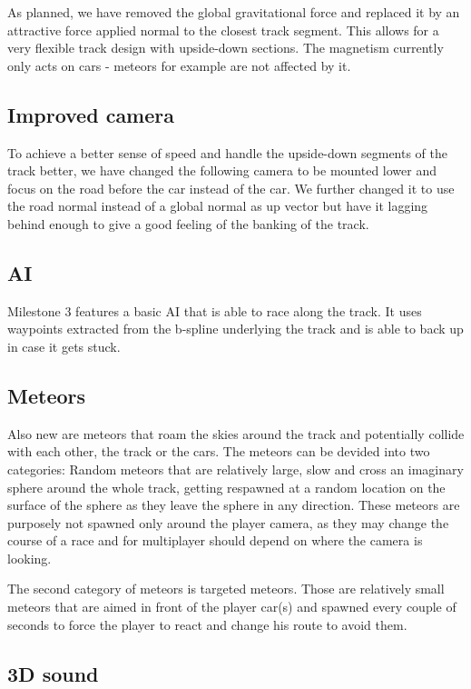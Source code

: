 \documentclass[11pt]{article}
\begin{document}
As planned, we have removed the global gravitational force and replaced it by an attractive force applied normal to the closest track segment.
This allows for a very flexible track design with upside-down sections. The magnetism currently only acts on cars - meteors for example are not affected by it.

\subsection{Improved camera}

To achieve a better sense of speed and handle the upside-down segments of the track better, we have changed the following camera to be mounted lower and focus on the road before the car instead of the car. We further changed it to use the road normal instead of a global normal as up vector but have it lagging behind enough to give a good feeling of the banking of the track.

\subsection{AI}

Milestone 3 features a basic AI that is able to race along the track. It uses waypoints extracted from the b-spline underlying the track and is able to back up in case it gets stuck.

\subsection{Meteors}

Also new are meteors that roam the skies around the track and potentially collide with each other, the track or the cars. The meteors can be devided into two categories: Random meteors that are relatively large, slow and cross an imaginary sphere around the whole track, getting respawned at a random location on the surface of the sphere as they leave the sphere in any direction. These meteors are purposely not spawned only around the player camera, as they may change the course of a race and for multiplayer should depend on where the camera is looking. 

The second category of meteors is targeted meteors. Those are relatively small meteors that are aimed in front of the player car(s) and spawned every couple of seconds to force the player to react and change his route to avoid them.

\subsection{3D sound}
\end{document}
